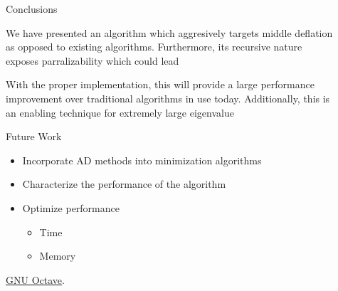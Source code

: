 \documentclass[final]{beamer}
\newlength{\sepwid}
\newlength{\onecolwid}
\newlength{\twocolwid}
\begin{document}
\begin{frame}[t]
\begin{columns}[t]
\begin{column}{\twocolwid}
\end{column} %

\begin{column}{\sepwid}\end{column} %

\begin{column}{\onecolwid} %


\begin{block}{Conclusions}

We have presented an algorithm which aggresively targets
middle deflation as opposed to existing algorithms.
Furthermore, its recursive nature exposes parralizability
which could lead 

With the proper implementation, this will provide a
large performance improvement over traditional algorithms in use today.
Additionally, this is an enabling technique for extremely large eigenvalue

\end{block}


\begin{block}{Future Work}

\begin{itemize}
  \item Incorporate AD methods into minimization algorithms
  \item Characterize the performance of the algorithm
  \item Optimize performance
  \begin{itemize}
    \item Time
    \item Memory
  \end{itemize}
\end{itemize}

\href{http://octave.org/}{GNU Octave}.


\end{block}
\end{column}
\end{columns}
\end{frame}
\end{document}
